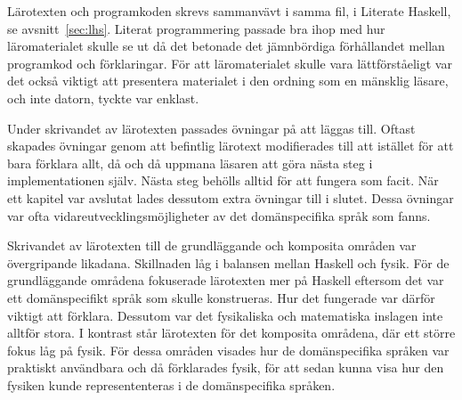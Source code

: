 \begin{draft}

Lärotexten och programkoden skrevs sammanvävt i samma fil, i Literate
Haskell, se avsnitt~\ref{sec:lhs}. Literat programmering passade bra ihop med
hur läromaterialet skulle se ut då det betonade det jämnbördiga förhållandet
mellan programkod och förklaringar. För att läromaterialet skulle vara
lättförståeligt var det också viktigt att presentera materialet i den ordning
som en mänsklig läsare, och inte datorn, tyckte var enklast.

Under skrivandet av lärotexten passades övningar på att läggas till. Oftast skapades övningar genom att befintlig lärotext modifierades till att istället för att bara förklara allt, då och då uppmana läsaren att göra nästa steg i implementationen själv. Nästa steg behölls alltid för att fungera som facit. När ett kapitel var avslutat lades dessutom extra övningar till i slutet. Dessa övningar var ofta vidareutvecklingsmöjligheter av det domänspecifika språk som fanns.

Skrivandet av lärotexten till de grundläggande och komposita områden var övergripande likadana. Skillnaden låg i balansen mellan Haskell och fysik. För de grundläggande områdena fokuserade lärotexten mer på Haskell eftersom det var ett domänspecifikt språk som skulle konstrueras. Hur det fungerade var därför viktigt att förklara. Dessutom var det fysikaliska och matematiska inslagen inte alltför stora. I kontrast står lärotexten för det komposita områdena, där ett större fokus låg på fysik. För dessa områden visades hur de domänspecifika språken var praktiskt användbara och då förklarades fysik, för att sedan kunna visa hur den fysiken kunde represententeras i de domänspecifika språken.

\end{draft}
